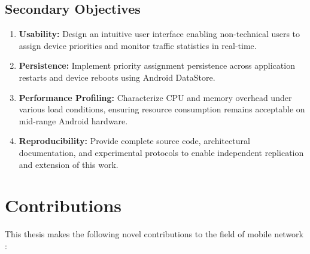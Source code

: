 \subsection{Secondary Objectives}

\begin{enumerate}[label=\textbf{S\arabic*:},leftmargin=*]
    \item \textbf{Usability:} Design an intuitive user interface enabling non-technical users to assign device priorities and monitor traffic statistics in real-time.
    
    \item \textbf{Persistence:} Implement priority assignment persistence across application restarts and device reboots using Android DataStore.
    
    \item \textbf{Performance Profiling:} Characterize CPU and memory overhead under various load conditions, ensuring resource consumption remains acceptable on mid-range Android hardware.
    
    \item \textbf{Reproducibility:} Provide complete source code, architectural documentation, and experimental protocols to enable independent replication and extension of this work.
\end{enumerate}

\section{Contributions}
\label{sec:contributions}

This thesis makes the following novel contributions to the field of mobile network \qos:

